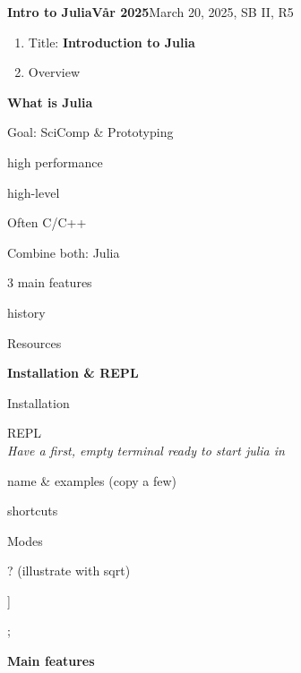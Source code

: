 \documentclass[a5paper,12pt,DIV=14,footheight=-30pt, headheight=60pt, twoside=off]{scrartcl}
\newenvironment{sublist}[1][]{%
  \color{juliapurple}%
  \quad\begin{enumerate*}[#1]%
}%
{\end{enumerate*}}
\begin{document}
\thispagestyle{empty}
\textbf{Intro to Julia\quad Vår 2025}\hfill{March 20, 2025, SB II, R5}\\
\begin{enumerate}
    \item Title:
    \textbf{Introduction to Julia}
    \item Overview
\end{enumerate}
\textbf{What is Julia}
\begin{enumerate}[resume]
    \item Goal: SciComp \& Prototyping
    \begin{sublist}
        \item high performance \item high-level \item Often C/C++
    \end{sublist}
    \item Combine both: Julia
    \begin{sublist}
        \item 3 main features \item history
    \end{sublist}
    \item Resources
\end{enumerate}
\textbf{Installation \& REPL}
\begin{enumerate}[resume]
    \item Installation
    \item REPL\\
    \emph{Have a first, empty terminal ready to start julia in}
    \\
    \begin{sublist}
        \item name \& examples (copy a few)
        \item shortcuts
    \end{sublist}
    \item Modes
    \begin{sublist}
        \item ? (illustrate with sqrt)\item ] \item ;
    \end{sublist}
\end{enumerate}
\textbf{Main features}
\end{document}

